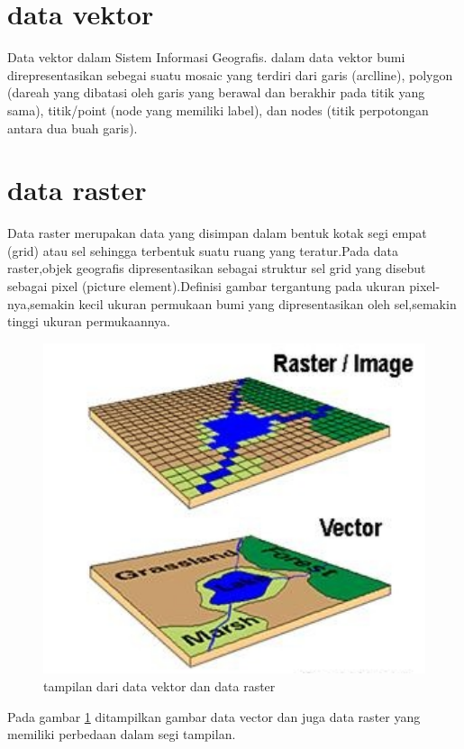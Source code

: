 


\section{data vektor}
  Data vektor dalam Sistem Informasi Geografis. dalam  data vektor bumi direpresentasikan sebegai suatu  mosaic yang terdiri dari garis (arclline), polygon (dareah yang dibatasi oleh garis yang berawal dan berakhir pada titik yang sama), titik/point (node yang memiliki label),  dan nodes (titik perpotongan antara dua buah garis).
  
 \section{data raster}
 Data raster merupakan data yang disimpan dalam bentuk kotak segi empat (grid)
atau sel sehingga terbentuk suatu ruang yang teratur.Pada data raster,objek geografis dipresentasikan sebagai struktur sel grid yang disebut sebagai pixel (picture element).Definisi gambar tergantung pada ukuran pixel-nya,semakin kecil ukuran permukaan bumi yang dipresentasikan oleh sel,semakin tinggi ukuran permukaannya.

\begin{figure}[ht]
\centerline{\includegraphics[width=1\textwidth] {figures/vektor01.JPG}}
\caption{tampilan dari data vektor dan data raster}
\label{vektor01}
\end{figure}
Pada gambar \ref{vektor01} ditampilkan gambar data vector dan juga data raster yang memiliki perbedaan dalam segi tampilan.

